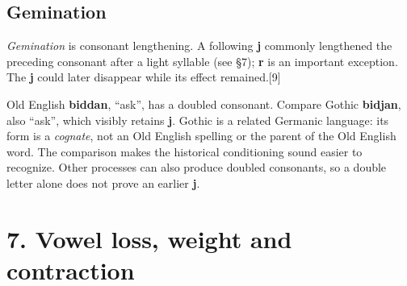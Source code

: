 \subsection*{Gemination}
\emph{Gemination} is consonant lengthening. A following \textbf{j} commonly lengthened the preceding consonant after a light syllable (see §7); \textbf{r} is an important exception. The \textbf{j} could later disappear while its effect remained.[9]\par
Old English \textbf{biddan}, “ask”, has a doubled consonant. Compare Gothic \textbf{bidjan}, also “ask”, which visibly retains \textbf{j}. Gothic is a related Germanic language: its form is a \emph{cognate}, not an Old English spelling or the parent of the Old English word. The comparison makes the historical conditioning sound easier to recognize. Other processes can also produce doubled consonants, so a double letter alone does not prove an earlier \textbf{j}.\par
\section*{7. Vowel loss, weight and contraction}
